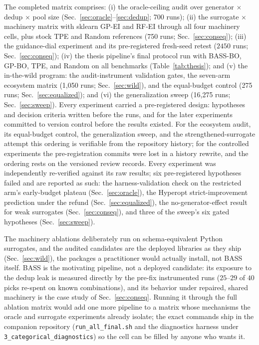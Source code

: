 \documentclass[%
 aip,
 amsmath,amssymb,
 floatfix,
 reprint,%
]{revtex4-1}
\begin{document}
The completed matrix comprises: (i) the oracle-ceiling audit over
generator $\times$ dedup $\times$ pool size
(Sec.~\ref{sec:oracle}--\ref{sec:dedup}; 700 runs); (ii) the surrogate
$\times$ machinery matrix with sklearn GP-EI and RF-EI through all four
machinery cells, plus stock TPE and Random references (750 runs;
Sec.~\ref{sec:conseq}); (iii) the guidance-dial experiment and its
pre-registered fresh-seed retest ($2450$ runs; Sec.~\ref{sec:conseq});
(iv) the thesis pipeline's final protocol run with BASS-BO, GP-BO,
TPE, and Random on all benchmarks (Table~\ref{tab:thesis}); and (v) the
in-the-wild program: the audit-instrument validation gates, the
seven-arm ecosystem matrix (1{,}050 runs; Sec.~\ref{sec:wild}), and the
equal-budget control (275 runs; Sec.~\ref{sec:equalized}); and (vi) the
generalization sweep (16{,}275 runs; Sec.~\ref{sec:sweep}). Every
experiment carried a pre-registered design: hypotheses and decision
criteria written before the runs, and for the later experiments
committed to version control before the results existed. For the
ecosystem audit, its equal-budget control, the generalization sweep, and
the strengthened-surrogate attempt this ordering is verifiable from the repository history; for the
controlled experiments the pre-registration commits were lost in a
history rewrite, and the ordering rests on the versioned review records. Every
experiment was independently re-verified against its raw results; six
pre-registered hypotheses failed and are reported as such: the
harness-validation check on the restricted arm's early-budget plateau
(Sec.~\ref{sec:oracle}), the Hyperopt strict-improvement prediction
under the refund (Sec.~\ref{sec:equalized}), the no-generator-effect
result for weak surrogates (Sec.~\ref{sec:conseq}), and three of the
sweep's six gated hypotheses (Sec.~\ref{sec:sweep}).

The machinery ablations deliberately run on schema-equivalent Python
surrogates, and the audited candidates are the deployed libraries as they
ship (Sec.~\ref{sec:wild}), the packages a practitioner would actually
install, not BASS itself. BASS is the motivating pipeline, not a
deployed candidate: its exposure to the dedup leak is measured directly by
the pre-fix instrumented runs ($25$--$29$ of $40$ picks re-spent on known
combinations), and its behavior under repaired, shared machinery is the
case study of Sec.~\ref{sec:conseq}. Running it through the full ablation
matrix would add one more pipeline to a matrix whose mechanisms the oracle
and surrogate experiments already isolate; the exact commands ship in the
companion repository (\texttt{run\_all\_final.sh} and the diagnostics
harness under \texttt{3\_categorical\_diagnostics}) so the cell can be
filled by anyone who wants it.
\end{document}
